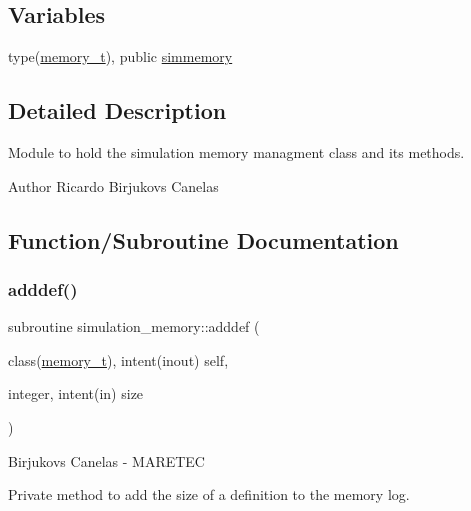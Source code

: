\subsection*{Variables}
\begin{DoxyCompactItemize}
\item 
type(\mbox{\hyperlink{structsimulation__memory_1_1memory__t}{memory\+\_\+t}}), public \mbox{\hyperlink{namespacesimulation__memory_a8ed2bc20b0c49405084442d02fc76d42}{simmemory}}
\end{DoxyCompactItemize}


\subsection{Detailed Description}
Module to hold the simulation memory managment class and its methods. 

\begin{DoxyAuthor}{Author}
Ricardo Birjukovs Canelas 
\end{DoxyAuthor}


\subsection{Function/\+Subroutine Documentation}
\mbox{\label{namespacesimulation__memory_a62d5641dbec45bc279575c173b0f0f24}} 
\subsubsection{\texorpdfstring{adddef()}{adddef()}}
{\footnotesize\ttfamily subroutine simulation\+\_\+memory\+::adddef (\begin{DoxyParamCaption}\item[{class(\mbox{\hyperlink{structsimulation__memory_1_1memory__t}{memory\+\_\+t}}), intent(inout)}]{self,  }\item[{integer, intent(in)}]{size }\end{DoxyParamCaption})\hspace{0.3cm}{\ttfamily [private]}}



Birjukovs Canelas -\/ M\+A\+R\+E\+T\+EC 

Private method to add the size of a definition to the memory log. \mbox{\label{namespacesimulation__memory_acf01ce7bcb2d7571d37fb2c0338e5bd2}} 
